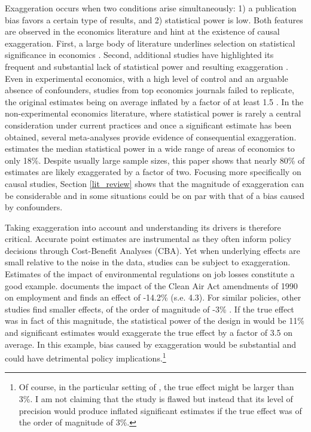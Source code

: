 			Exaggeration occurs when two conditions arise simultaneously: 1) a publication bias favors a certain type of results, and 2) statistical power is low. Both features are observed in the economics literature and hint at the existence of causal exaggeration. First, a large body of literature underlines selection on statistical significance in economics \citep[for instance]{rosenthal_file_1979, brodeur_star_2016, andrews_identification_2019, abadie_statistical_2020, brodeur_methods_2020}. Second, additional studies have highlighted its frequent and substantial lack of statistical power and resulting exaggeration \citep{ioannidis_power_2017, ferraro_featureis_2020}. Even in experimental economics, with a high level of control and an arguable absence of confounders, studies from top economics journals failed to replicate, the original estimates being on average inflated by a factor of at least 1.5 \citep{camerer_evaluating_2016}. In the non-experimental economics literature, where statistical power is rarely a central consideration under current practices and once a significant estimate has been obtained, several meta-analyses provide evidence of consequential exaggeration. \cite{ioannidis_power_2017} estimates the median statistical power in a wide range of areas of economics to only 18\%. Despite usually large sample sizes, this paper shows that nearly 80\% of estimates are likely exaggerated by a factor of two. Focusing more specifically on causal studies, Section \ref{lit_review} shows that the magnitude of exaggeration can be considerable and in some situations could be on par with that of a bias caused by confounders. 
			
			Taking exaggeration into account and understanding its drivers is therefore critical. Accurate point estimates are instrumental as they often inform policy decisions through Cost-Benefit Analyses (CBA). Yet when underlying effects are small relative to the noise in the data, studies can be subject to exaggeration. Estimates of the impact of environmental regulations on job losses constitute a good example. \cite{walker_environmental_2011} documents the impact of the Clean Air Act amendments of 1990 on employment and finds an effect of -14.2\% (s.e. 4.3). For similar policies, other studies find smaller effects, of the order of magnitude of -3\% \citep{greenstone_impacts_2002, gray_environmental_2023}. If the true effect was in fact of this magnitude, the statistical power of the design in \cite{walker_environmental_2011} would be 11\% and significant estimates would exaggerate the true effect by a factor of 3.5 on average. In this example, bias caused by exaggeration would be substantial and could have detrimental policy implications.\footnote{Of course, in the particular setting of \cite{walker_environmental_2011}, the true effect might be larger than 3\%. I am not claiming that the study is flawed but instead that its level of precision would produce inflated significant estimates if the true effect was of the order of magnitude of 3\%.}
			
